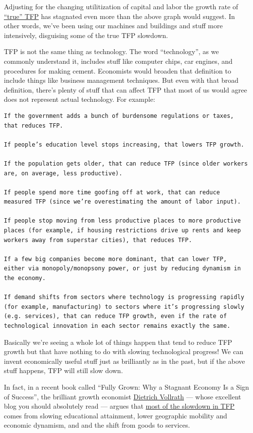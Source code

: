 \documentclass[
]{book}
\begin{document}
Adjusting for the changing utilitization of capital and labor the growth rate
of \href{https://growthecon.com/blog/BLS-TFP/}{``true'' TFP} has stagnated even more than the above graph would suggest.
In other words, we've been using our machines and buildings and stuff more intensively,
disguising some of the true TFP slowdown.

TFP is not the same thing as technology. The word ``technology'', as we commonly understand it, includes stuff like computer chips, car engines, and procedures for making cement. Economists would broaden that definition to include things like business management techniques. But even with that broad definition, there's plenty of stuff that can affect TFP that most of us would agree does not represent actual technology. For example:

\begin{verbatim}
If the government adds a bunch of burdensome regulations or taxes, that reduces TFP.

If people’s education level stops increasing, that lowers TFP growth.

If the population gets older, that can reduce TFP (since older workers are, on average, less productive).

If people spend more time goofing off at work, that can reduce measured TFP (since we’re overestimating the amount of labor input).

If people stop moving from less productive places to more productive places (for example, if housing restrictions drive up rents and keep workers away from superstar cities), that reduces TFP.

If a few big companies become more dominant, that can lower TFP, either via monopoly/monopsony power, or just by reducing dynamism in the economy.

If demand shifts from sectors where technology is progressing rapidly (for example, manufacturing) to sectors where it’s progressing slowly (e.g. services), that can reduce TFP growth, even if the rate of technological innovation in each sector remains exactly the same.
\end{verbatim}

Basically we're seeing a whole lot of things happen that tend to reduce TFP growth but that have nothing to do with slowing technological progress! We can invent economically useful stuff just as brilliantly as in the past, but if the above stuff happens, TFP will still slow down.

In fact, in a recent book called ``Fully Grown: Why a Stagnant Economy Is a Sign of Success'', the brilliant growth economist \href{https://growthecon.com/blog/}{Dietrich Vollrath} --- whose excellent blog you should absolutely read --- argues that \href{https://medium.com/@mattclancy/fully-grown-a-review-a55719c6049c}{most of the slowdown in TFP} comes from slowing educational attainment, lower geographic mobility and economic dynamism, and and the shift from goods to services.
\end{document}
